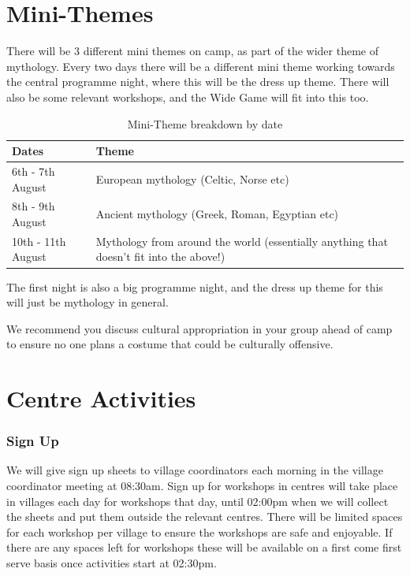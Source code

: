 \documentclass[a4paper, 11pt]{report}
\newcommand{\nl}{\newline}
\begin{document}
\section{Mini-Themes}
There will be 3 different mini themes on camp, as part of the wider theme of mythology. Every two days there will be a different mini theme working towards the central programme night, where this will be the dress up theme. There will also be some relevant workshops, and the Wide Game will fit into this too.

\begin{table}[H]
    \centering
    {\RaggedRight
    \begin{tabular}{p{} p{}}
        \textbf{Dates} & \textbf{Theme}\\
        \hline
        6th - 7th August & European mythology (Celtic, Norse etc)\\
        \hline
        8th - 9th August & Ancient mythology (Greek, Roman, Egyptian etc)\\
        \hline
        10th - 11th August & Mythology from around the world (essentially anything that doesn't fit into the above!)\\
        \hline
    \end{tabular}
    }%
    \caption{Mini-Theme breakdown by date}
\end{table}
The first night is also a big programme night, and the dress up theme for this will just be mythology in general. \nl

We recommend you discuss cultural appropriation in your group ahead of camp to ensure no one plans a costume that could be culturally offensive.

\section{Centre Activities}
\subsubsection{Sign Up}
We will give sign up sheets to village coordinators each morning in the village coordinator meeting at 08:30am. Sign up for workshops in centres will take place in villages each day for workshops that day, until 02:00pm when we will collect the sheets and put them outside the relevant centres. There will be limited spaces for each workshop per village to ensure the workshops are safe and enjoyable. If there are any spaces left for workshops these will be available on a first come first serve basis once activities start at 02:30pm.
\end{document}

